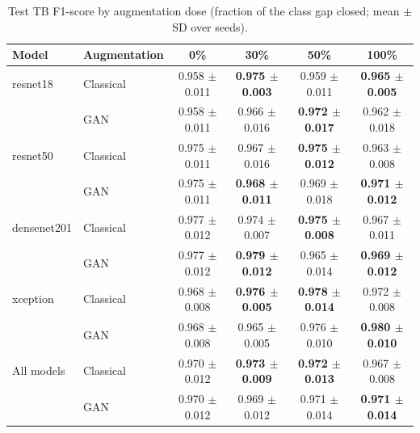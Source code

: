 \begin{table}[htbp]
\centering
\caption{Test TB F1-score by augmentation dose (fraction of the class gap closed; mean $\pm$ SD over seeds).}
\label{tab:dose_tb_f1}
\begin{tabular}{llcccc}
\toprule
Model & Augmentation & 0\% & 30\% & 50\% & 100\% \\
\midrule
resnet18 & Classical & 0.958 $\pm$ 0.011 & \textbf{0.975 $\pm$ 0.003} & 0.959 $\pm$ 0.011 & \textbf{0.965 $\pm$ 0.005} \\
 & GAN & 0.958 $\pm$ 0.011 & 0.966 $\pm$ 0.016 & \textbf{0.972 $\pm$ 0.017} & 0.962 $\pm$ 0.018 \\
\addlinespace
resnet50 & Classical & 0.975 $\pm$ 0.011 & 0.967 $\pm$ 0.016 & \textbf{0.975 $\pm$ 0.012} & 0.963 $\pm$ 0.008 \\
 & GAN & 0.975 $\pm$ 0.011 & \textbf{0.968 $\pm$ 0.011} & 0.969 $\pm$ 0.018 & \textbf{0.971 $\pm$ 0.012} \\
\addlinespace
densenet201 & Classical & 0.977 $\pm$ 0.012 & 0.974 $\pm$ 0.007 & \textbf{0.975 $\pm$ 0.008} & 0.967 $\pm$ 0.011 \\
 & GAN & 0.977 $\pm$ 0.012 & \textbf{0.979 $\pm$ 0.012} & 0.965 $\pm$ 0.014 & \textbf{0.969 $\pm$ 0.012} \\
\addlinespace
xception & Classical & 0.968 $\pm$ 0.008 & \textbf{0.976 $\pm$ 0.005} & \textbf{0.978 $\pm$ 0.014} & 0.972 $\pm$ 0.008 \\
 & GAN & 0.968 $\pm$ 0.008 & 0.965 $\pm$ 0.005 & 0.976 $\pm$ 0.010 & \textbf{0.980 $\pm$ 0.010} \\
\addlinespace
All models & Classical & 0.970 $\pm$ 0.012 & \textbf{0.973 $\pm$ 0.009} & \textbf{0.972 $\pm$ 0.013} & 0.967 $\pm$ 0.008 \\
 & GAN & 0.970 $\pm$ 0.012 & 0.969 $\pm$ 0.012 & 0.971 $\pm$ 0.014 & \textbf{0.971 $\pm$ 0.014} \\
\bottomrule
\end{tabular}
\end{table}